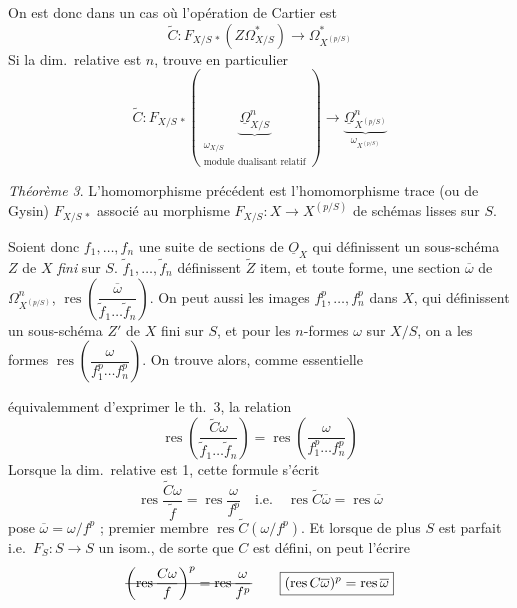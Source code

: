 \documentclass[11pt,a4paper]{article}
\begin{document}
On est donc dans un cas où l'opération de Cartier est
\[
\widetilde{C} : F_{X/S\,*}(Z\Omega^{*}_{X/S}) \to \Omega^{*}_{X^{(p/S)}}
\]
Si la dim.\ relative est $n$,  trouve en particulier
\[
\widetilde{C} : F_{X/S\,*}(\underbrace{\underline{\Omega}^{n}_{X/S}}_{\substack{\omega_{X/S} \\ \text{module dualisant relatif}}}) \to \underbrace{\underline{\Omega}^{n}_{X^{(p/S)}}}_{\omega_{X^{(p/S)}}}
\]

\emph{Théorème 3}. L'homomorphisme précédent est l'homomorphisme trace (ou de Gysin) $F_{X/S\,*}$ associé au morphisme $F_{X/S} : X \to X^{(p/S)}$ de schémas lisses sur $S$.

Soient donc $f_{1}, \ldots, f_{n}$ une suite de sections de $\underline{O}_{X}$ qui définissent un sous-schéma $Z$  de $X$ \emph{fini} sur $S$.  $\widetilde{f}_{1}, \ldots, \widetilde{f}_{n}$ définissent  $\widetilde{Z}$ item, et  toute forme,  une section $\overline{\omega}$ de $\Omega^{n}_{X^{(p/S)}}$,  $\operatorname{res}\left(\dfrac{\overline{\omega}}{\widetilde{f}_{1} \ldots \widetilde{f}_{n}}\right)$.
On peut aussi  les images $f_{1}^{p}, \ldots, f_{n}^{p}$ dans $X$, qui définissent un sous-schéma $Z'$ de $X$ fini sur $S$, et pour les $n$-formes $\omega$ sur $X/S$, on a les formes $\operatorname{res}\left(\dfrac{\omega}{f_{1}^{p} \ldots f_{n}^{p}}\right)$. On trouve alors, comme  essentielle

 équivalemment d'exprimer le th.~3, la relation
\[
\boxed{\operatorname{res}\left(\frac{\widetilde{C}\omega}{\widetilde{f}_{1} \ldots \widetilde{f}_{n}}\right) = \operatorname{res}\left(\frac{\omega}{f_{1}^{p} \ldots f_{n}^{p}}\right)}
\]
Lorsque la dim.\ relative est 1, cette formule s'écrit
\[
\operatorname{res}\frac{\widetilde{C}\omega}{\widetilde{f}} = \operatorname{res}\frac{\omega}{f^{p}} \quad \text{i.e.} \quad \boxed{\operatorname{res}\widetilde{C}\overline{\omega} = \operatorname{res}\overline{\omega}}
\]
  pose $\overline{\omega} = \omega/f^{p}$ ;  premier membre   $\operatorname{res}\widetilde{C}(\omega/f^{p})$.
Et lorsque de plus $S$ est parfait i.e.\ $F_{S} : S \to S$ un isom., de sorte que $C$ est défini, on peut l'écrire
\[
\text{\struck{$\left(\operatorname{res}\dfrac{C\omega}{f}\right)^{p} = \operatorname{res}\dfrac{\omega}{f^{p}}$}} \qquad \boxed{(\operatorname{res} C\overline{\omega})^{p} = \operatorname{res}\overline{\omega}}
\]
\end{document}
